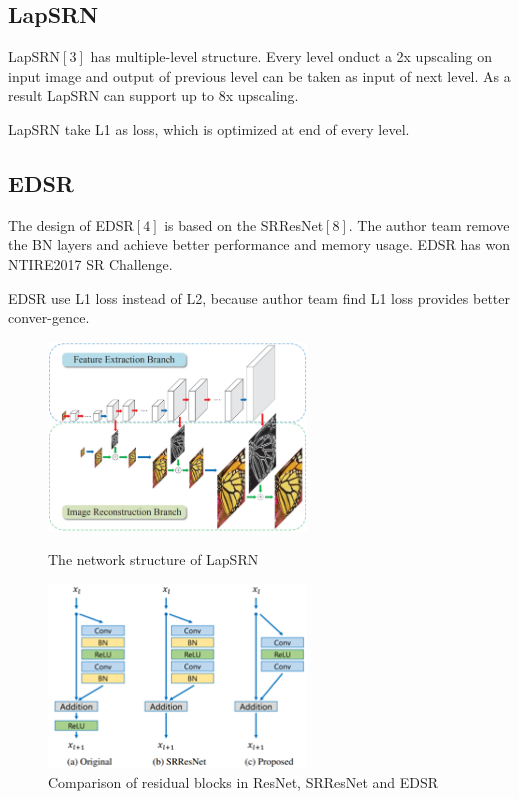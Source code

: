\documentclass{article}
\begin{document}
  \subsection{LapSRN}
  LapSRN$[3]$ has multiple-level structure. Every level onduct a 2x upscaling on input 
  image and output of previous level can be taken as input of next level. As a result LapSRN can support up to 8x upscaling. 
  
  LapSRN take L1 as loss, which is optimized at end of every level.
  
  \subsection{EDSR}
  The design of EDSR$[4]$ is based on the SRResNet$[8]$. 
  The author team remove the BN layers and achieve better performance and memory usage. 
  EDSR has won NTIRE2017 SR Challenge.

  EDSR use L1 loss instead of L2, because author team find L1 loss provides better conver-gence.
  
  \begin{figure}[H]
    \begin{minipage}[H]{0.5\linewidth}
    \centering
    \includegraphics[width=2.7in]{images/LapSRN.png}
    \caption{The network structure of LapSRN}

    \end{minipage}
    \begin{minipage}[H]{0.5\linewidth}
    \centering
    \includegraphics[width=2.7in]{images/EDSR1.png}
    \caption{Comparison of residual blocks in ResNet, SRResNet and EDSR}

    \end{minipage}
\end{figure}
\end{document}
